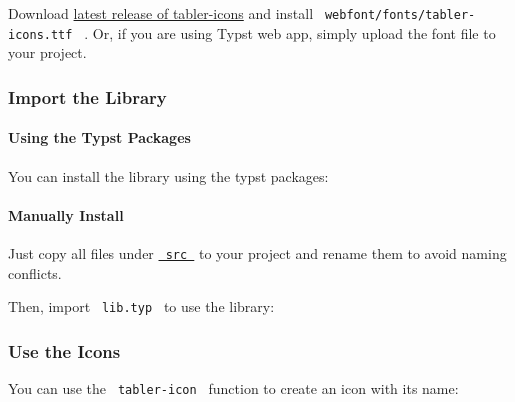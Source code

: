 Download \href{https://github.com/tabler/tabler-icons/releases}{latest
release of tabler-icons} and install
\texttt{\ webfont/fonts/tabler-icons.ttf\ } . Or, if you are using Typst
web app, simply upload the font file to your project.

\subsubsection{Import the Library}\label{import-the-library}

\paragraph{Using the Typst Packages}\label{using-the-typst-packages}

You can install the library using the typst packages:

\begin{Shaded}
\begin{Highlighting}[]
\end{Highlighting}
\end{Shaded}

\paragraph{Manually Install}\label{manually-install}

Just copy all files under
\href{https://github.com/zyf722/typst-tabler-icons/tree/main/src}{\texttt{\ src\ }}
to your project and rename them to avoid naming conflicts.

Then, import \texttt{\ lib.typ\ } to use the library:

\begin{Shaded}
\begin{Highlighting}[]
\end{Highlighting}
\end{Shaded}

\subsubsection{Use the Icons}\label{use-the-icons}

You can use the \texttt{\ tabler-icon\ } function to create an icon with
its name:

\begin{Shaded}
\begin{Highlighting}[]
\end{Highlighting}
\end{Shaded}

